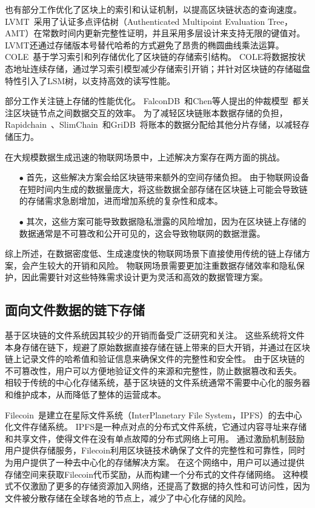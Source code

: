 也有部分工作优化了区块上的索引和认证机制，以提高区块链状态的查询速度。
LVMT~\cite{li2023lvmt}采用了认证多点评估树（Authenticated Multipoint Evaluation Tree，AMT）在常数时间内更新完整性证明，并且采用多层设计来支持无限的键值对。
LVMT还通过存储版本号替代哈希的方式避免了昂贵的椭圆曲线乘法运算。
COLE~\cite{zhang2024cole}基于学习索引和列存储优化了区块链的存储索引结构。
COLE将数据按状态地址连续存储，通过学习索引模型减少存储索引开销；并针对区块链的存储磁盘特性引入了LSM树，以支持高效的读写性能。

部分工作关注链上存储的性能优化。
FalconDB~\cite{peng2020falcondb}和Chen等人提出的仲裁模型~\cite{chen2022blockchain}都关注区块链节点之间数据交互的效率。
为了减轻区块链账本数据存储的负担，Rapidchain~\cite{zamani2018rapidchain}、SlimChain~\cite{xu2021slimchain}和GriDB~\cite{hong2023gridb}将账本的数据分配给其他分片存储，以减轻存储压力。

在大规模数据生成迅速的物联网场景中，上述解决方案存在两方面的挑战。

\begin{itemize}
    \item[$\bullet$] 首先，这些解决方案会给区块链带来额外的空间存储负担。
    由于物联网设备在短时间内生成的数据量庞大，将这些数据全部存储在区块链上可能会导致链的存储需求急剧增加，进而增加系统的复杂性和成本。
    \item[$\bullet$] 其次，这些方案可能导致数据隐私泄露的风险增加，因为在区块链上存储的数据通常是不可篡改和公开可见的，这会导致物联网的数据泄露。
\end{itemize}

综上所述，在数据密度低、生成速度快的物联网场景下直接使用传统的链上存储方案，会产生较大的开销和风险。
物联网场景需要更加注重数据存储效率和隐私保护，因此需要针对这些特殊需求设计更为灵活和高效的数据管理方案。

\subsection{面向文件数据的链下存储}
基于区块链的文件系统因其较少的开销而备受广泛研究和关注。
这些系统将文件本身存储在链下，规避了原始数据直接存储在链上带来的巨大开销，并通过在区块链上记录文件的哈希值和验证信息来确保文件的完整性和安全性。
由于区块链的不可篡改性，用户可以方便地验证文件的来源和完整性，防止数据篡改和丢失。
相较于传统的中心化存储系统，基于区块链的文件系统通常不需要中心化的服务器和维护成本，从而降低了整体的运营成本。

Filecoin~\cite{bauer2022filecoin}是建立在星际文件系统（InterPlanetary File System，IPFS）的去中心化文件存储系统。
IPFS是一种点对点的分布式文件系统，它通过内容寻址来存储和共享文件，使得文件在没有单点故障的分布式网络上可用。
通过激励机制鼓励用户提供存储服务，Filecoin利用区块链技术确保了文件的完整性和可靠性，同时为用户提供了一种去中心化的存储解决方案。
在这个网络中，用户可以通过提供存储空间来获取Filecoin代币奖励，从而构建一个分布式的文件存储网络。
这种模式不仅激励了更多的存储资源加入网络，还提高了数据的持久性和可访问性，因为文件被分散存储在全球各地的节点上，减少了中心化存储的风险。

